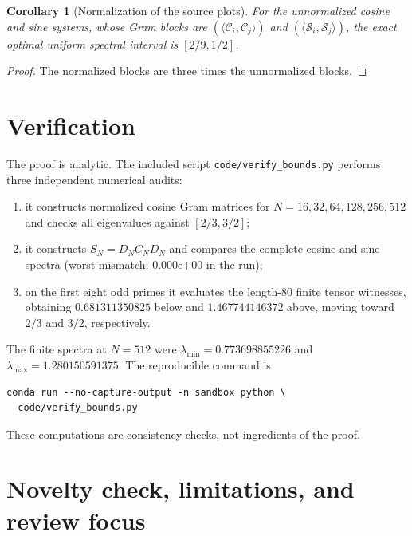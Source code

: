 \documentclass[11pt]{article}
\newtheorem{corollary}[theorem]{Corollary}
\newcommand{\CalC}{\mathcal C}
\newcommand{\CalS}{\mathcal S}
\begin{document}
\begin{corollary}[Normalization of the source plots]\label{cor:unnormalized}
For the unnormalized cosine and sine systems, whose Gram blocks are
\((\langle\CalC_i,\CalC_j\rangle)\) and
\((\langle\CalS_i,\CalS_j\rangle)\), the exact optimal uniform spectral
interval is \([2/9,1/2]\).
\end{corollary}
\begin{proof}
The normalized blocks are three times the unnormalized blocks.
\end{proof}

\section{Verification}

The proof is analytic.  The included script \texttt{code/verify\_bounds.py}
performs three independent numerical audits:
\begin{enumerate}[leftmargin=*]
\item it constructs normalized cosine Gram matrices for
\(N=16,32,64,128,256,512\) and checks all eigenvalues against
\([2/3,3/2]\);
\item it constructs \(S_N=D_NC_ND_N\) and compares the complete cosine and
sine spectra (worst mismatch: \(0.000\mathrm e{+00}\) in the run);
\item on the first eight odd primes it evaluates the length-80 finite tensor
witnesses, obtaining \(0.681311350825\) below and \(1.467744146372\) above,
moving toward \(2/3\) and \(3/2\), respectively.
\end{enumerate}
The finite spectra at \(N=512\) were
\(\lambda_{\min}=0.773698855226\) and
\(\lambda_{\max}=1.280150591375\).  The reproducible command is
\begin{verbatim}
conda run --no-capture-output -n sandbox python \
  code/verify_bounds.py
\end{verbatim}
These computations are consistency checks, not ingredients of the proof.

\section{Novelty check, limitations, and review focus}
\end{document}
